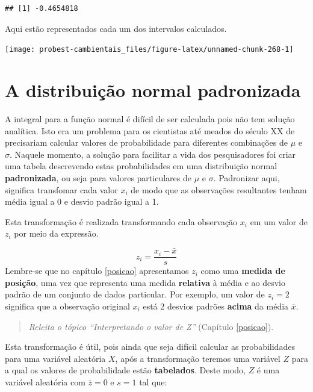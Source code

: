 \documentclass[
]{book}
\begin{document}
\begin{verbatim}
## [1] -0.4654818
\end{verbatim}

Aqui estão representados cada um dos intervalos calculados.

\begin{center}\texttt{[image: probest-cambientais\_files/figure-latex/unnamed-chunk-268-1]} \end{center}

\hypertarget{a-distribuiuxe7uxe3o-normal-padronizada}{%
\section{A distribuição normal padronizada}\label{a-distribuiuxe7uxe3o-normal-padronizada}}

A integral para a função normal é difícil de ser calculada pois não tem solução analítica. Isto era um problema para os cientistas até meados do século XX de precisariam calcular valores de probabilidade para diferentes combinações de \(\mu\) e \(\sigma\). Naquele momento, a solução para facilitar a vida dos pesquisadores foi criar uma tabela descrevendo estas probabilidades em uma distribuição normal \textbf{padronizada}, ou seja para valores particulares de \(\mu\) e \(\sigma\). Padronizar aqui, significa transfomar cada valor \(x_i\) de modo que as observações resultantes tenham média igual a 0 e desvio padrão igual a 1.

Esta transformação é realizada transformando cada observação \(x_i\) em um valor de \(z_i\) por meio da expressão.

\[z_i = \frac{x_i - \bar{x}}{s}\]
Lembre-se que no capítulo \ref{posicao} apresentamos \(z_i\) como uma \textbf{medida de posição}, uma vez que representa uma medida \textbf{relativa} à média e ao desvio padrão de um conjunto de dados particular. Por exemplo, um valor de \(z_i = 2\) significa que a observação original \(x_i\) está 2 desvios padrões \textbf{acima} da média \(\overline{x}\).

\begin{quote}
\emph{Releita o tópico ``Interpretando o valor de Z''} (Capítulo \ref{posicao}).
\end{quote}

Esta transformação é útil, pois ainda que seja difícil calcular as probabilidades para uma variável aleatória \(X\), após a transformação teremos uma variável \(Z\) para a qual os valores de probabilidade estão \textbf{tabelados}. Deste modo, \(Z\) é uma variável aleatória com \(\overline{z} = 0\) e \(s = 1\) tal que:
\end{document}
